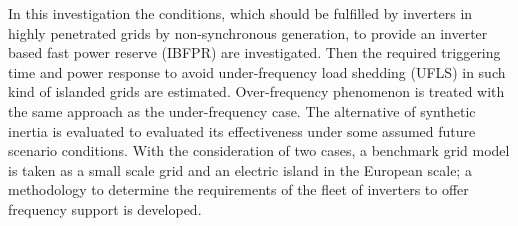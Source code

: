  In this investigation the conditions, which should be fulfilled by inverters in highly penetrated grids by non-synchronous generation, to provide an inverter based fast power reserve (IBFPR) are investigated. Then the required triggering time and power response to avoid under-frequency load shedding (UFLS) in such kind of islanded grids are estimated. Over-frequency phenomenon is treated with the same approach as the under-frequency case. The alternative of synthetic inertia is evaluated to evaluated its effectiveness under some assumed future scenario conditions. With the consideration of two cases, a benchmark grid model is taken as a small scale grid and an electric island in the European scale; a methodology to determine the requirements of the fleet of inverters to offer frequency support is developed. %

